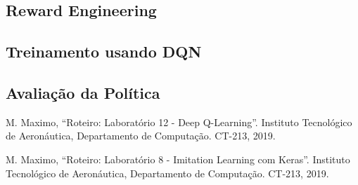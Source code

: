 \documentclass[conference]{IEEEtran}
\begin{document}
	\subsection{Reward Engineering}

	\subsection{Treinamento usando DQN}
	
	\subsection{Avaliação da Política}
	
\begin{thebibliography}{00}
 M. Maximo, ``Roteiro: Laboratório 12 - Deep Q-Learning''. Instituto Tecnológico de Aeronáutica, Departamento de Computação. CT-213, 2019.

 M. Maximo, ``Roteiro: Laboratório 8 - Imitation Learning com Keras''. Instituto Tecnológico de Aeronáutica, Departamento de Computação. CT-213, 2019.

\end{thebibliography}
\end{document}
